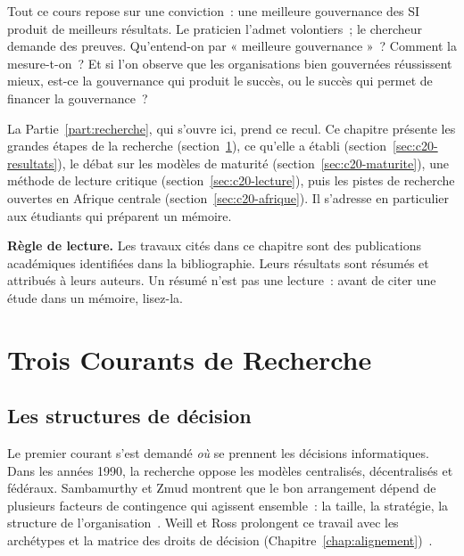 Tout ce cours repose sur une conviction~: une meilleure gouvernance des SI
produit de meilleurs résultats. Le praticien l'admet volontiers~; le
chercheur demande des preuves. Qu'entend-on par « meilleure
gouvernance »~? Comment la mesure-t-on~? Et si l'on observe que les
organisations bien gouvernées réussissent mieux, est-ce la gouvernance qui
produit le succès, ou le succès qui permet de financer la gouvernance~?

La Partie~\ref{part:recherche}, qui s'ouvre ici, prend ce recul. Ce
chapitre présente les grandes étapes de la recherche
(section~\ref{sec:c20-courants}), ce qu'elle a établi
(section~\ref{sec:c20-resultats}), le débat sur les modèles de maturité
(section~\ref{sec:c20-maturite}), une méthode de lecture critique
(section~\ref{sec:c20-lecture}), puis les pistes de recherche ouvertes en
Afrique centrale (section~\ref{sec:c20-afrique}). Il s'adresse en
particulier aux étudiants qui préparent un mémoire.

\begin{boxinfo}
\textbf{Règle de lecture.} Les travaux cités dans ce chapitre sont des
publications académiques identifiées dans la bibliographie. Leurs
résultats sont résumés et attribués à leurs auteurs. Un résumé n'est pas
une lecture~: avant de citer une étude dans un mémoire, lisez-la.
\end{boxinfo}

\separateur

\section{Trois Courants de Recherche}
\label{sec:c20-courants}

\subsection{Les structures de décision}

Le premier courant s'est demandé \emph{où} se prennent les décisions
informatiques. Dans les années 1990, la recherche oppose les modèles
centralisés, décentralisés et fédéraux. Sambamurthy et Zmud montrent que
le bon arrangement dépend de plusieurs facteurs de contingence qui
agissent ensemble~: la taille, la stratégie, la structure de
l'organisation~\cite{sambamurthy1999arrangements}. Weill et Ross
prolongent ce travail avec les archétypes et la matrice des droits de
décision (Chapitre~\ref{chap:alignement})~\cite{weill2004itgovernance}.

